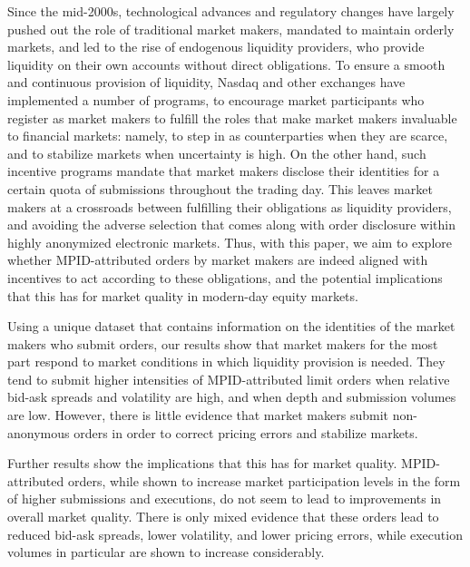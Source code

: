 \documentclass{article}
\begin{document}
Since the mid-2000s, technological advances and regulatory changes have largely pushed out the role of traditional market makers, mandated to maintain orderly markets, and led to the rise of endogenous liquidity providers, who provide liquidity on their own accounts without direct obligations. To ensure a smooth and continuous provision of liquidity, Nasdaq and other exchanges have implemented a number of programs, to encourage market participants who register as market makers to fulfill the roles that make market makers invaluable to financial markets: namely, to step in as counterparties when they are scarce, and to stabilize markets when uncertainty is high. On the other hand, such incentive programs mandate that market makers disclose their identities for a certain quota of submissions throughout the trading day. This leaves market makers at a crossroads between fulfilling their obligations as liquidity providers, and avoiding the adverse selection that comes along with order disclosure within highly anonymized electronic markets. Thus, with this paper, we aim to explore whether MPID-attributed orders by market makers are indeed aligned with incentives to act according to these obligations, and the potential implications that this has for market quality in modern-day equity markets.

\noindent Using a unique dataset that contains information on the identities of the market makers who submit orders, our results show that market makers for the most part respond to market conditions in which liquidity provision is needed. They tend to submit higher intensities of MPID-attributed limit orders when relative bid-ask spreads and volatility are high, and when depth and submission volumes are low. However, there is little evidence that market makers submit non-anonymous orders in order to correct pricing errors and stabilize markets. 

\noindent Further results show the implications that this has for market quality. MPID-attributed orders, while shown to increase market participation levels in the form of higher submissions and executions, do not seem to lead to improvements in overall market quality. There is only mixed evidence that these orders lead to reduced bid-ask spreads, lower volatility, and lower pricing errors, while execution volumes in particular are shown to increase considerably.  
\end{document}
